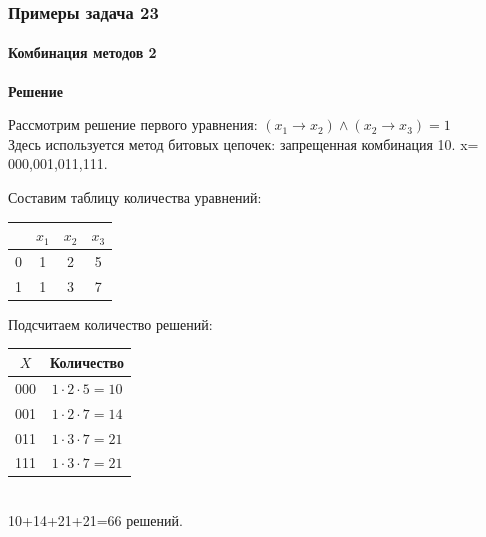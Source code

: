 \begin{frame}[t]
\frametitle{Примеры задача 23}
\framesubtitle{Комбинация методов 2}
\textbf{Решение}

Рассмотрим решение первого уравнения: $(x_1 \rightarrow x_2) \wedge (x_2 \rightarrow x_3) = 1$\\
Здесь используется метод битовых цепочек: запрещенная комбинация 10.
x= 000,001,011,111.

\setlength{\columnsep}{0.4cm}
\begin{multicols}{2}
Составим таблицу количества уравнений:\\
\begin{tabular}{|c|c|c|c|}
\hline
   & $x_1$ & $x_2$ & $x_3$ \tabularnewline
\hline
 0 & 1     &   2   &  5\tabularnewline
 1 & 1     &   3   &  7 \tabularnewline
\hline
\end{tabular}
\pause

\columnbreak
Подсчитаем количество решений:\\
\begin{tabular}{|c|c|}
\hline
  $X$ & Количество  \tabularnewline
\hline
 000 & $1\cdot 2\cdot 5=10$  \tabularnewline
 001 & $1\cdot 2\cdot 7=14$   \tabularnewline
 011 & $1\cdot 3\cdot 7=21$   \tabularnewline
 111 & $1\cdot 3\cdot 7=21$   \tabularnewline
\hline
\end{tabular}\\
10+14+21+21=66 решений.

\end{multicols}





\end{frame}


